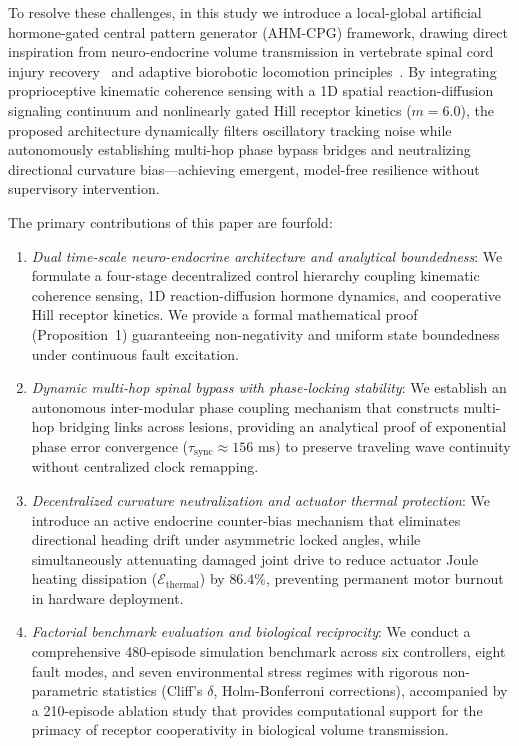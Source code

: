 \documentclass{iopjournal}
\begin{document}
To resolve these challenges, in this study we introduce a local-global artificial hormone-gated central pattern generator (AHM-CPG) framework, drawing direct inspiration from neuro-endocrine volume transmission in vertebrate spinal cord injury recovery~\cite{courtine2008,rossignol2011,bargmann2012} and adaptive biorobotic locomotion principles~\cite{wang2026,manoonpong2007,manoonpong2013,ijspeert2008}. By integrating proprioceptive kinematic coherence sensing with a 1D spatial reaction-diffusion signaling continuum and nonlinearly gated Hill receptor kinetics ($m=6.0$), the proposed architecture dynamically filters oscillatory tracking noise while autonomously establishing multi-hop phase bypass bridges and neutralizing directional curvature bias—achieving emergent, model-free resilience without supervisory intervention.

The primary contributions of this paper are fourfold:
\begin{enumerate}
  \item \textit{Dual time-scale neuro-endocrine architecture and analytical boundedness}: We formulate a four-stage decentralized control hierarchy coupling kinematic coherence sensing, 1D reaction-diffusion hormone dynamics, and cooperative Hill receptor kinetics. We provide a formal mathematical proof (Proposition~1) guaranteeing non-negativity and uniform state boundedness under continuous fault excitation.
  \item \textit{Dynamic multi-hop spinal bypass with phase-locking stability}: We establish an autonomous inter-modular phase coupling mechanism that constructs multi-hop bridging links across lesions, providing an analytical proof of exponential phase error convergence ($\tau_{\text{sync}} \approx 156\text{ ms}$) to preserve traveling wave continuity without centralized clock remapping.
  \item \textit{Decentralized curvature neutralization and actuator thermal protection}: We introduce an active endocrine counter-bias mechanism that eliminates directional heading drift under asymmetric locked angles, while simultaneously attenuating damaged joint drive to reduce actuator Joule heating dissipation ($\mathcal{E}_{\text{thermal}}$) by $86.4\%$, preventing permanent motor burnout in hardware deployment.
  \item \textit{Factorial benchmark evaluation and biological reciprocity}: We conduct a comprehensive 480-episode simulation benchmark across six controllers, eight fault modes, and seven environmental stress regimes with rigorous non-parametric statistics (Cliff's $\delta$, Holm-Bonferroni corrections), accompanied by a 210-episode ablation study that provides computational support for the primacy of receptor cooperativity in biological volume transmission.
\end{enumerate}
\end{document}
